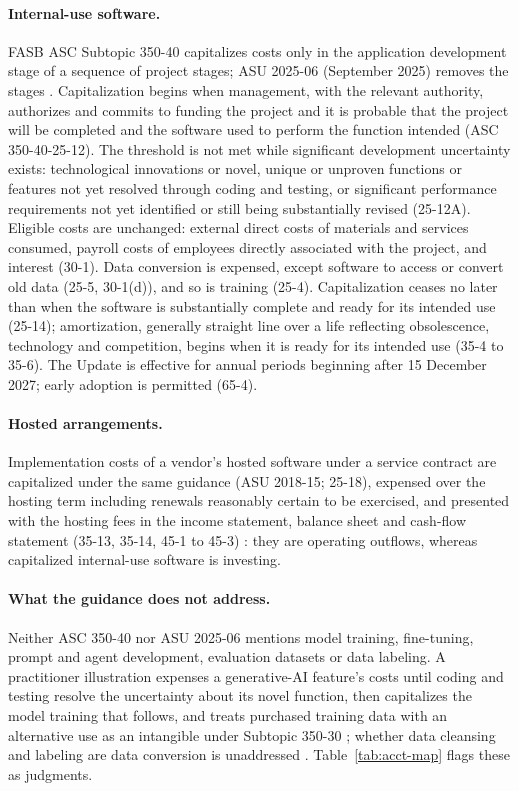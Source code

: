 \paragraph{Internal-use software.} FASB ASC Subtopic 350-40 \citep{fasb2026asc35040} capitalizes costs only in the application development stage of a sequence of project stages; ASU 2025-06 (September 2025) removes the stages \citep{fasb2025asu202506}. Capitalization begins when management, with the relevant authority, authorizes and commits to funding the project and it is probable that the project will be completed and the software used to perform the function intended (ASC 350-40-25-12). The threshold is not met while significant development uncertainty exists: technological innovations or novel, unique or unproven functions or features not yet resolved through coding and testing, or significant performance requirements not yet identified or still being substantially revised (25-12A). Eligible costs are unchanged: external direct costs of materials and services consumed, payroll costs of employees directly associated with the project, and interest (30-1). Data conversion is expensed, except software to access or convert old data (25-5, 30-1(d)), and so is training (25-4). Capitalization ceases no later than when the software is substantially complete and ready for its intended use (25-14); amortization, generally straight line over a life reflecting obsolescence, technology and competition, begins when it is ready for its intended use (35-4 to 35-6). The Update is effective for annual periods beginning after 15 December 2027; early adoption is permitted (65-4).

\paragraph{Hosted arrangements.} Implementation costs of a vendor's hosted software under a service contract are capitalized under the same guidance (ASU 2018-15; 25-18), expensed over the hosting term including renewals reasonably certain to be exercised, and presented with the hosting fees in the income statement, balance sheet and cash-flow statement (35-13, 35-14, 45-1 to 45-3) \citep{fasb2018asu201815}: they are operating outflows, whereas capitalized internal-use software is investing.

\paragraph{What the guidance does not address.} Neither ASC 350-40 nor ASU 2025-06 mentions model training, fine-tuning, prompt and agent development, evaluation datasets or data labeling. A practitioner illustration expenses a generative-AI feature's costs until coding and testing resolve the uncertainty about its novel function, then capitalizes the model training that follows, and treats purchased training data with an alternative use as an intangible under Subtopic 350-30 \citep{deloitte2025headsup}; whether data cleansing and labeling are data conversion is unaddressed \citep{deloitte2026aicosts}. Table~\ref{tab:acct-map} flags these as judgments.


